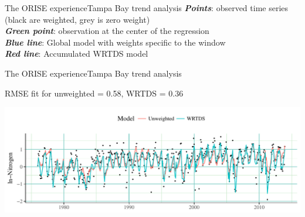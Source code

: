 \documentclass[serif]{beamer}\usepackage[]{graphicx}\usepackage[]{color}
\newcommand{\emtxt}[1]{\textbf{\textit{#1}}}
\begin{document}
\begin{frame}{The ORISE experience}{Tampa Bay trend analysis}
{\small
\emtxt{Points}: observed time series (black are weighted, grey is zero weight)\\
\emtxt{Green point}: observation at the center of the regression\\
\emtxt{Blue line}: Global model with weights specific to the window\\
\emtxt{Red line}: Accumulated WRTDS model
}
\begin{center}
\end{center}
\end{frame}

\begin{frame}{The ORISE experience}{Tampa Bay trend analysis}
\centerline{RMSE fit for unweighted = 0.58, WRTDS = 0.36}
\begin{center}
\includegraphics[width = \textwidth]{fig/wrtds_perf.pdf}
\end{center}
\end{frame}
\end{document}
